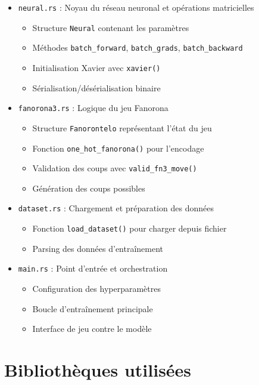 \documentclass[12pt,a4paper]{report}
\numberwithin{equation}{section}
\begin{document}
\begin{itemize}
  \item \texttt{\color{primaryblue}neural.rs} : Noyau du réseau neuronal et opérations matricielles
  \begin{itemize}
    \item Structure \texttt{Neural} contenant les paramètres
    \item Méthodes \texttt{batch\_forward}, \texttt{batch\_grads}, \texttt{batch\_backward}
    \item Initialisation Xavier avec \texttt{xavier()}
    \item Sérialisation/désérialisation binaire
  \end{itemize}
  
  \item \texttt{\color{primaryblue}fanorona3.rs} : Logique du jeu Fanorona
  \begin{itemize}
    \item Structure \texttt{Fanorontelo} représentant l'état du jeu
    \item Fonction \texttt{one\_hot\_fanorona()} pour l'encodage
    \item Validation des coups avec \texttt{valid\_fn3\_move()}
    \item Génération des coups possibles
  \end{itemize}
  
  \item \texttt{\color{primaryblue}dataset.rs} : Chargement et préparation des données
  \begin{itemize}
    \item Fonction \texttt{load\_dataset()} pour charger depuis fichier
    \item Parsing des données d'entraînement
  \end{itemize}
  
  \item \texttt{\color{primaryblue}main.rs} : Point d'entrée et orchestration
  \begin{itemize}
    \item Configuration des hyperparamètres
    \item Boucle d'entraînement principale
    \item Interface de jeu contre le modèle
  \end{itemize}
\end{itemize}

\section{Bibliothèques utilisées}
\end{document}

